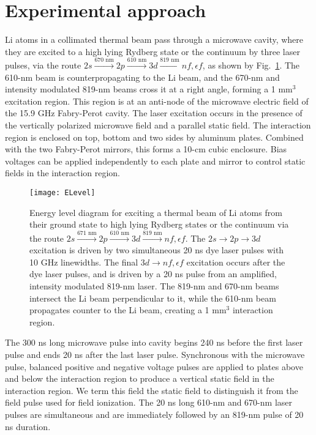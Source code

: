 \documentclass[aps,pra,reprint,groupedaddress]{revtex4-1}
\begin{document}
\section{\label{sec:exp} Experimental approach}

Li atoms in a collimated thermal beam pass through a microwave cavity, where they are excited to a high lying Rydberg state or the continuum by three laser pulses, via the route $2s \xrightarrow{\text{670 nm}} 2p \xrightarrow{\text{610 nm}} 3d \xrightarrow{\text{819 nm}} nf, \epsilon f$, as shown by Fig.~\ref{fig:ELev}. The 610-nm beam is counterpropagating to the Li beam, and the 670-nm and intensity modulated 819-nm beams cross it at a right angle, forming a 1 mm$^3$ excitation region. This region is at an anti-node of the microwave electric field of the 15.9 GHz Fabry-Perot cavity. The laser excitation occurs in the presence of the vertically polarized microwave field and a parallel static field. The interaction region is enclosed on top, bottom and two sides by aluminum plates. Combined with the two Fabry-Perot mirrors, this forms a 10-cm cubic enclosure. Bias voltages can be applied independently to each plate and mirror to control static fields in the interaction region.

\begin{figure}
	\texttt{[image: ELevel]}
	\caption{Energy level diagram for exciting a thermal beam of Li atoms from their ground state to high lying Rydberg states or the continuum via the route $2s \xrightarrow{\text{671 nm}} 2p \xrightarrow{\text{610 nm}} 3d \xrightarrow{\text{819 nm}} nf, \epsilon f$. The $2s \rightarrow 2p \rightarrow 3d$ excitation is driven by two simultaneous 20 ns dye laser pulses with 10 GHz linewidths. The final $3d \rightarrow nf, \epsilon f$ excitation occurs after the dye laser pulses, and is driven by a 20 ns pulse from an amplified, intensity modulated 819-nm laser. The 819-nm and 670-nm beams intersect the Li beam perpendicular to it, while the 610-nm beam propagates counter to the Li beam, creating a 1 mm$^3$ interaction region.}
	\label{fig:ELev}
\end{figure}

The 300 ns long microwave pulse into cavity begins 240 ns before the first laser pulse and ends 20 ns after the last laser pulse. Synchronous with the microwave pulse, balanced positive and negative voltage pulses are applied to plates above and below the interaction region to produce a vertical static field in the interaction region. We term this field the static field to distinguish it from the field pulse used for field ionization. The 20 ns long 610-nm and 670-nm laser pulses are simultaneous and are immediately followed by an 819-nm pulse of 20 ns duration.
\end{document}
